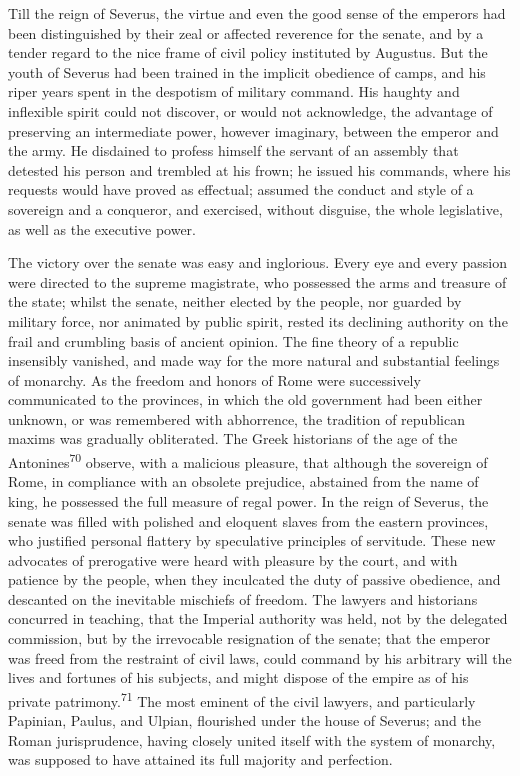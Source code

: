 Till the reign of Severus, the virtue and even the good sense of
the emperors had been distinguished by their zeal or affected
reverence for the senate, and by a tender regard to the nice
frame of civil policy instituted by Augustus. But the youth of
Severus had been trained in the implicit obedience of camps, and
his riper years spent in the despotism of military command. His
haughty and inflexible spirit could not discover, or would not
acknowledge, the advantage of preserving an intermediate power,
however imaginary, between the emperor and the army. He disdained
to profess himself the servant of an assembly that detested his
person and trembled at his frown; he issued his commands, where
his requests would have proved as effectual; assumed the conduct
and style of a sovereign and a conqueror, and exercised, without
disguise, the whole legislative, as well as the executive power.

The victory over the senate was easy and inglorious. Every eye
and every passion were directed to the supreme magistrate, who
possessed the arms and treasure of the state; whilst the senate,
neither elected by the people, nor guarded by military force, nor
animated by public spirit, rested its declining authority on the
frail and crumbling basis of ancient opinion. The fine theory of
a republic insensibly vanished, and made way for the more natural
and substantial feelings of monarchy. As the freedom and honors
of Rome were successively communicated to the provinces, in which
the old government had been either unknown, or was remembered
with abhorrence, the tradition of republican maxims was gradually
obliterated. The Greek historians of the age of the Antonines\textsuperscript{70}
observe, with a malicious pleasure, that although the sovereign
of Rome, in compliance with an obsolete prejudice, abstained from
the name of king, he possessed the full measure of regal power.
In the reign of Severus, the senate was filled with polished and
eloquent slaves from the eastern provinces, who justified
personal flattery by speculative principles of servitude. These
new advocates of prerogative were heard with pleasure by the
court, and with patience by the people, when they inculcated the
duty of passive obedience, and descanted on the inevitable
mischiefs of freedom. The lawyers and historians concurred in
teaching, that the Imperial authority was held, not by the
delegated commission, but by the irrevocable resignation of the
senate; that the emperor was freed from the restraint of civil
laws, could command by his arbitrary will the lives and fortunes
of his subjects, and might dispose of the empire as of his
private patrimony.\textsuperscript{71} The most eminent of the civil lawyers, and
particularly Papinian, Paulus, and Ulpian, flourished under the
house of Severus; and the Roman jurisprudence, having closely
united itself with the system of monarchy, was supposed to have
attained its full majority and perfection.

